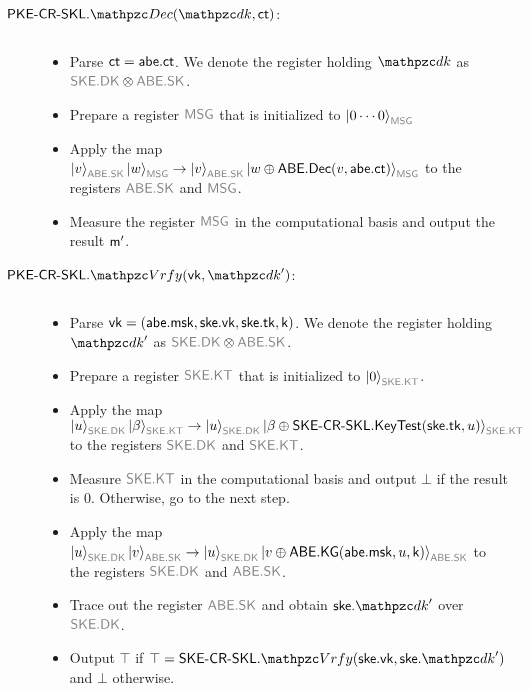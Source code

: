 \begin{description}
\item[$\PKECRSKL.\qDec(\qdk,\ct)$:] $ $
\begin{itemize}
   \item Parse $\mathsf{ct}=\mathsf{abe}.\mathsf{ct}$. We denote the register holding $\qdk$ as $\qreg{SKE.DK}\tensor\qreg{ABE.SK}$.
   \item Prepare a register $\qreg{MSG}$ that is initialized to $\ket{0\cdots0}_{\qreg{MSG}}$
   \item Apply the map $\ket{v}_{\qreg{ABE.SK}}\ket{w}_{\qreg{MSG}}\ra\ket{v}_{\qreg{ABE.SK}}\ket{w\oplus\ABE.\Dec(v,\abe.\ct)}_{\qreg{MSG}}$ to the registers $\qreg{ABE.SK}$ and $\qreg{MSG}$.
   \item Measure the register $\qreg{MSG}$ in the computational basis and output the result $\mathsf{m}^\prime$.
\end{itemize}


\item[$\PKECRSKL.\qVrfy(\vk,\qdk^\prime)$:] $ $
\begin{itemize}
    \item Parse $\mathsf{vk}=(\mathsf{abe}.\mathsf{msk},\mathsf{ske}.\mathsf{vk},\mathsf{ske}.\mathsf{tk}, \mathsf{k})$. We denote the register holding $\qdk^\prime$ as $\qreg{SKE.DK}\tensor\qreg{ABE.SK}$.
    \item Prepare a register $\qreg{SKE.KT}$ that is initialized to $\ket{0}_{\qreg{SKE.KT}}$.
    \item Apply the map $\ket{u}_{\qreg{SKE.DK}}\ket{\beta}_{\qreg{SKE.KT}}\ra\ket{u}_{\qreg{SKE.DK}}\ket{\beta\oplus\SKECRSKL.\KeyTest(\ske.\tk,u)}_{\qreg{SKE.KT}}$ to the registers $\qreg{SKE.DK}$ and $\qreg{SKE.KT}$.
    \item Measure $\qreg{SKE.KT}$ in the computational basis and output $\bot$ if the result is $0$. Otherwise, go to the next step.
    \item Apply the map
        $\ket{u}_{\qreg{SKE.DK}}\ket{v}_{\qreg{ABE.SK}}\ra\ket{u}_{\qreg{SKE.DK}}\ket{v\oplus\ABE.\KG(\abe.\msk,u,
        \key)}_{\qreg{ABE.SK}}$ to the registers $\qreg{SKE.DK}$ and $\qreg{ABE.SK}$.
    \item Trace out the register $\qreg{ABE.SK}$ and obtain $\ske.\qdk^\prime$ over $\qreg{SKE.DK}$.
    \item Output $\top$ if $\top=\SKECRSKL.\qVrfy(\ske.\vk,\ske.\qdk')$
        and $\bot$ otherwise.

\end{itemize}
\end{description}

